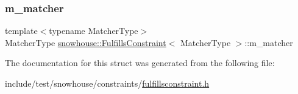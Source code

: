 \subsubsection{\texorpdfstring{m\_matcher}{m\_matcher}}
{\footnotesize\ttfamily template$<$typename Matcher\+Type$>$ \\
Matcher\+Type \mbox{\hyperlink{structsnowhouse_1_1FulfillsConstraint}{snowhouse\+::\+Fulfills\+Constraint}}$<$ Matcher\+Type $>$\+::m\+\_\+matcher}



The documentation for this struct was generated from the following file\+:\begin{DoxyCompactItemize}
\item 
include/test/snowhouse/constraints/\mbox{\hyperlink{fulfillsconstraint_8h}{fulfillsconstraint.\+h}}\end{DoxyCompactItemize}
